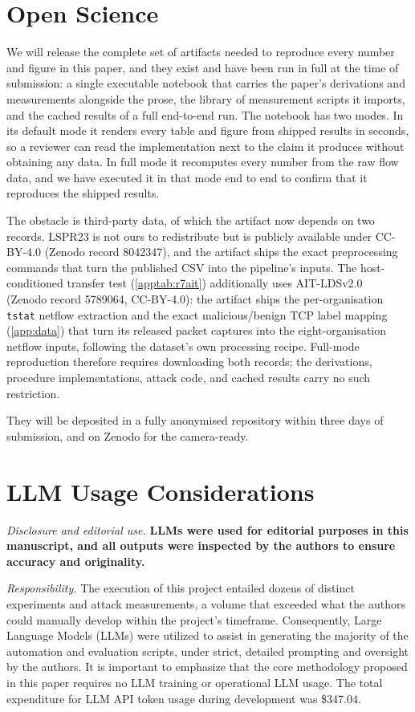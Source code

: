 \documentclass[conference]{IEEEtran}
\begin{document}
\section*{Open Science}\label{sec:openscience}

We will release the complete set of artifacts needed to reproduce every number and figure in this
paper, and they exist and have been run in full at the time of submission: a single executable
notebook that carries the paper's derivations and measurements
alongside the prose, the library of measurement scripts it imports, and the cached results of a
full end-to-end run. The notebook has two modes. In its default mode it renders every table and
figure from shipped results in seconds, so a reviewer can read the implementation next to the
claim it produces without obtaining any data. In full mode it recomputes every number from the
raw flow data, and we have executed it in that mode end to end to confirm that it reproduces the
shipped results.

The obstacle is third-party data, of which the artifact now depends on two records. LSPR23 is not
ours to redistribute but is publicly available under CC-BY-4.0 (Zenodo record 8042347), and the
artifact ships the exact preprocessing commands that turn the published CSV into the pipeline's
inputs. The host-conditioned transfer test (\cref{apptab:r7ait}) additionally uses
AIT-LDSv2.0~\cite{aitlds} (Zenodo record 5789064, CC-BY-4.0): the artifact ships the per-organisation
\texttt{tstat} netflow extraction and the exact malicious/benign TCP label mapping
(\cref{app:data}) that turn its released packet captures into the eight-organisation netflow
inputs, following the dataset's own processing recipe. Full-mode reproduction therefore requires
downloading both records; the derivations, procedure implementations, attack code, and cached results
carry no such restriction.

They will be deposited in a fully anonymised repository within three days of submission, and on
Zenodo for the camera-ready.

\section*{LLM Usage Considerations}

\emph{Disclosure and editorial use.} \textbf{LLMs were used for editorial purposes in this manuscript, and all outputs were inspected by the authors to ensure accuracy and originality.}

\emph{Responsibility.} The execution of this project entailed dozens of distinct experiments and attack measurements, a volume that exceeded what the authors could manually develop within the project's timeframe. Consequently, Large Language Models (LLMs) were utilized to assist in generating the majority of the automation and evaluation scripts, under strict, detailed prompting and oversight by the authors. It is important to emphasize that the core methodology proposed in this paper requires no LLM training or operational LLM usage. The total expenditure for LLM API token usage during development was \$347.04.
\end{document}
